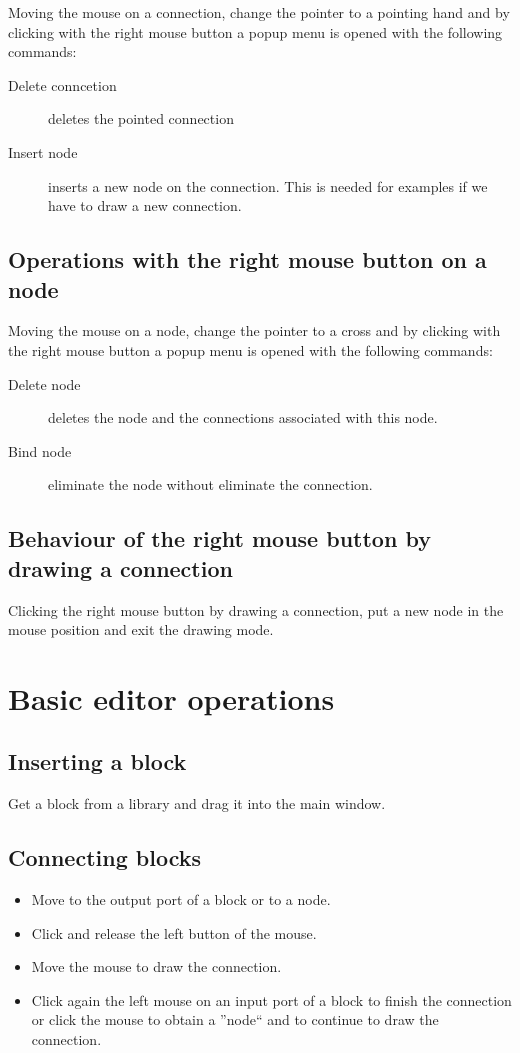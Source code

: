 Moving the mouse on a connection, change the pointer to a pointing hand and by 
clicking with the right mouse button a popup menu is opened with the following 
commands:

\begin{description}
\item[Delete conncetion] deletes the pointed connection
\item [Insert node] inserts a new node on the connection. This is needed for 
examples if we have to draw a new connection.
\end{description}

\subsection{Operations with the right mouse button on a node}

Moving the mouse on a node, change the pointer to a cross and by 
clicking with the right mouse button a popup menu is opened with the following 
commands:

\begin{description}
\item[Delete node] deletes the node and the connections associated with this 
node.
\item [Bind node] eliminate the node without eliminate the connection.
\end{description}

\subsection{Behaviour of the right mouse button by drawing a connection}
Clicking the right mouse button by drawing a connection, put a new node in the 
mouse position and exit the drawing mode.

\section{Basic editor operations}

\subsection{Inserting a block}
Get a block from a library and drag it into the main window.

\subsection{Connecting blocks}
\begin{itemize}
\item Move to the output port of a block or to a node.
\item Click and release the left button of the mouse.
\item Move the mouse to draw the connection.
\item Click again the left mouse on an input port of a block to finish the 
connection or click the mouse to obtain a ''node`` and to continue to draw the 
connection.
\end{itemize}

